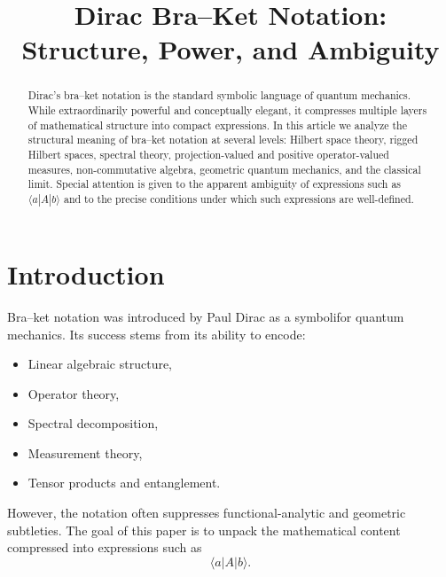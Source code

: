 \documentclass[12pt]{article}
\title{Dirac Bra--Ket Notation:\\
Structure, Power, and Ambiguity}
\author{}
\date{}
\begin{document}
\maketitle

\begin{abstract}
Dirac's bra--ket notation is the standard symbolic language of quantum
mechanics. While extraordinarily powerful and conceptually elegant,
it compresses multiple layers of mathematical structure into compact
expressions. In this article we analyze the structural meaning of
bra--ket notation at several levels: Hilbert space theory, rigged
Hilbert spaces, spectral theory, projection-valued and positive
operator-valued measures, non-commutative algebra, geometric quantum
mechanics, and the classical limit. Special attention is given to the
apparent ambiguity of expressions such as $\langle a|A|b\rangle$ and
to the precise conditions under which such expressions are well-defined.
\end{abstract}

\tableofcontents

\section{Introduction}

Bra--ket notation was introduced by Paul Dirac as a symbolifor quantum mechanics. Its success stems from its ability to encode:

\begin{itemize}
\item Linear algebraic structure,
\item Operator theory,
\item Spectral decomposition,
\item Measurement theory,
\item Tensor products and entanglement.
\end{itemize}

However, the notation often suppresses functional-analytic and
geometric subtleties. The goal of this paper is to unpack the
mathematical content compressed into expressions such as
\[
\langle a|A|b\rangle.
\]
\end{document}
